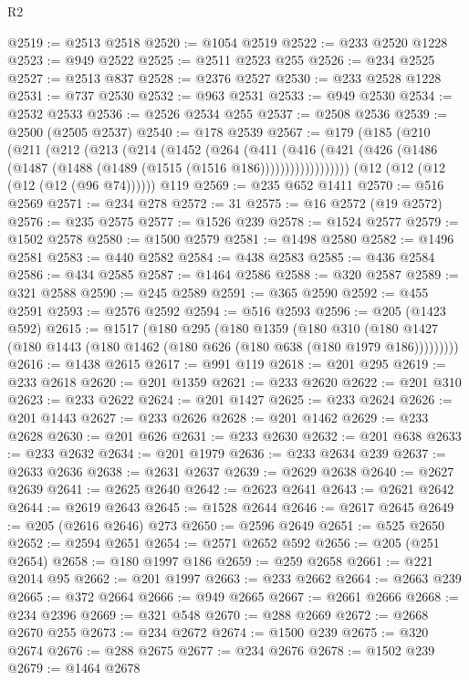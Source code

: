 \begin{lexlean}{R2}
\begin{coremodule}
@2519 := @2513 @2518
@2520 := @1054 @2519
@2522 := @233 @2520 @1228
@2523 := @949 @2522
@2525 := @2511 @2523 @255
@2526 := @234 @2525
@2527 := @2513 @837
@2528 := @2376 @2527
@2530 := @233 @2528 @1228
@2531 := @737 @2530
@2532 := @963 @2531
@2533 := @949 @2530
@2534 := @2532 @2533
@2536 := @2526 @2534 @255
@2537 := @2508 @2536
@2539 := @2500 (@2505 @2537)
@2540 := @178 @2539
@2567 := @179
    (@185
      (@210
        (@211
          (@212
            (@213
              (@214
                (@1452
                  (@264
                    (@411
                      (@416
                        (@421 (@426 (@1486 (@1487 (@1488 (@1489 (@1515 (@1516 @186))))))))))))))))))
    (@12 (@12 (@12 (@12 (@12 (@96 @74))))))
    @119
@2569 := @235 @652 @1411
@2570 := @516 @2569
@2571 := @234 @278
@2572 := 31
@2575 := @16 @2572 (@19 @2572)
@2576 := @235 @2575
@2577 := @1526 @239
@2578 := @1524 @2577
@2579 := @1502 @2578
@2580 := @1500 @2579
@2581 := @1498 @2580
@2582 := @1496 @2581
@2583 := @440 @2582
@2584 := @438 @2583
@2585 := @436 @2584
@2586 := @434 @2585
@2587 := @1464 @2586
@2588 := @320 @2587
@2589 := @321 @2588
@2590 := @245 @2589
@2591 := @365 @2590
@2592 := @455 @2591
@2593 := @2576 @2592
@2594 := @516 @2593
@2596 := @205 (@1423 @592)
@2615 := @1517
    (@180
      @295
      (@180
        @1359
        (@180
          @310
          (@180 @1427 (@180 @1443 (@180 @1462 (@180 @626 (@180 @638 (@180 @1979 @186)))))))))
@2616 := @1438 @2615
@2617 := @991 @119
@2618 := @201 @295
@2619 := @233 @2618
@2620 := @201 @1359
@2621 := @233 @2620
@2622 := @201 @310
@2623 := @233 @2622
@2624 := @201 @1427
@2625 := @233 @2624
@2626 := @201 @1443
@2627 := @233 @2626
@2628 := @201 @1462
@2629 := @233 @2628
@2630 := @201 @626
@2631 := @233 @2630
@2632 := @201 @638
@2633 := @233 @2632
@2634 := @201 @1979
@2636 := @233 @2634 @239
@2637 := @2633 @2636
@2638 := @2631 @2637
@2639 := @2629 @2638
@2640 := @2627 @2639
@2641 := @2625 @2640
@2642 := @2623 @2641
@2643 := @2621 @2642
@2644 := @2619 @2643
@2645 := @1528 @2644
@2646 := @2617 @2645
@2649 := @205 (@2616 @2646) @273
@2650 := @2596 @2649
@2651 := @525 @2650
@2652 := @2594 @2651
@2654 := @2571 @2652 @592
@2656 := @205 (@251 @2654)
@2658 := @180 @1997 @186
@2659 := @259 @2658
@2661 := @221 @2014 @95
@2662 := @201 @1997
@2663 := @233 @2662
@2664 := @2663 @239
@2665 := @372 @2664
@2666 := @949 @2665
@2667 := @2661 @2666
@2668 := @234 @2396
@2669 := @321 @548
@2670 := @288 @2669
@2672 := @2668 @2670 @255
@2673 := @234 @2672
@2674 := @1500 @239
@2675 := @320 @2674
@2676 := @288 @2675
@2677 := @234 @2676
@2678 := @1502 @239
@2679 := @1464 @2678

\end{coremodule}
\end{lexlean}
